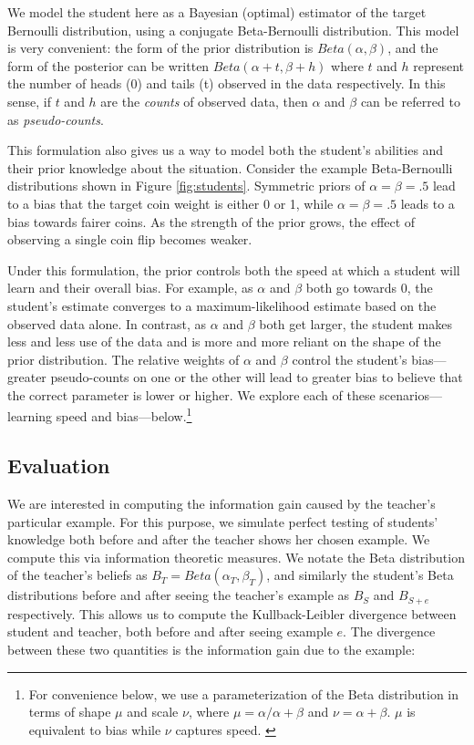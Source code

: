 \documentclass[10pt,letterpaper]{article}
\begin{document}
We model the student here as a Bayesian (optimal) estimator of the target Bernoulli distribution, using a conjugate Beta-Bernoulli distribution. This model is very convenient: the form of the prior distribution is $Beta(\alpha,\beta)$, and the form of the posterior can be written $Beta(\alpha+t,\beta+h)$ where $t$ and $h$ represent the number of heads (0) and tails (t) observed in the data respectively. In this sense, if $t$ and $h$ are the \emph{counts} of observed data, then $\alpha$ and $\beta$ can be referred to as \emph{pseudo-counts}.

This formulation also gives us a way to model both the student's abilities and their prior knowledge about the situation. Consider the example Beta-Bernoulli distributions shown in Figure \ref{fig:students}. Symmetric priors of $\alpha=\beta=.5$ lead to a bias that the target coin weight is either 0 or 1, while $\alpha=\beta=.5$ leads to a bias towards fairer coins. As the strength of the prior grows, the effect of observing a single coin flip becomes weaker.

Under this formulation, the prior controls both the speed at which a student will learn and their overall bias. For example, as $\alpha$ and $\beta$ both go towards 0, the student's estimate converges to a maximum-likelihood estimate based on the observed data alone. In contrast, as $\alpha$ and $\beta$ both get larger, the student makes less and less use of the data and is more and more reliant on the shape of the prior distribution. The relative weights of $\alpha$ and $\beta$ control the student's bias---greater pseudo-counts on one or the other will lead to greater bias to believe that the correct parameter is lower or higher. We explore each of these scenarios---learning speed and bias---below.\footnote{For convenience below, we use a parameterization of the Beta distribution in terms of shape $\mu$ and scale $\nu$, where $\mu=\alpha / \alpha + \beta$ and $\nu = \alpha + \beta$. $\mu$ is equivalent to bias while $\nu$ captures speed. \label{fn:munu}}

\subsection{Evaluation}

We are interested in computing the information gain caused by the teacher's particular example. For this purpose, we simulate perfect testing of students' knowledge both before and after the teacher shows her chosen example. We compute this via information theoretic measures. We notate the Beta distribution of the teacher's beliefs as $B_T = Beta(\alpha_T,\beta_T)$, and similarly the student's Beta distributions before and after seeing the teacher's example as $B_{S}$ and $B_{S+e}$ respectively. This allows us to compute the Kullback-Leibler divergence \cite{cover2012} between student and teacher, both before and after seeing example $e$. The divergence between these two quantities is the information gain due to the example:
\end{document}
